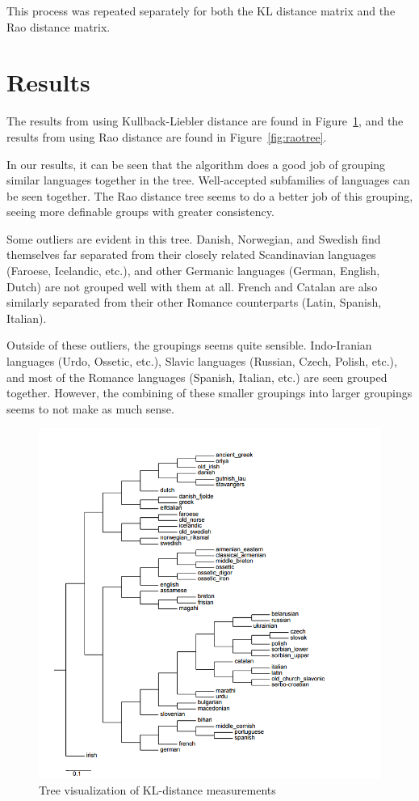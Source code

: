 \documentclass[10pt,a4]{article}
\begin{document}
This process was repeated separately for both the KL distance matrix and the Rao distance matrix.

\section{Results}
	
The results from using Kullback-Liebler distance are found in Figure~\ref{fig:kltree}, and the results from using Rao distance are found in Figure~\ref{fig:raotree}.

In our results, it can be seen that the algorithm does a good job of grouping similar languages together in the tree.  Well-accepted subfamilies of languages can be seen together.  The Rao distance tree seems to do a better job of this grouping, seeing more definable groups with greater consistency.

Some outliers are evident in this tree.  Danish, Norwegian, and Swedish find themselves far separated from their closely related Scandinavian languages (Faroese, Icelandic, etc.), and other Germanic languages (German, English, Dutch) are not grouped well with them at all.  French and Catalan are also similarly separated from their other Romance counterparts (Latin, Spanish, Italian).

Outside of these outliers, the groupings seems quite sensible.  Indo-Iranian languages (Urdo, Ossetic, etc.), Slavic languages (Russian, Czech, Polish, etc.), and most of the Romance languages (Spanish, Italian, etc.) are seen grouped together.  However, the combining of these smaller groupings into larger groupings seems to not make as much sense.

	
\begin{figure}[ht] 
	\centering 
	\includegraphics[width=\linewidth]{tree1(3)}
	\caption{Tree visualization of KL-distance measurements}
	\label{fig:kltree}
\end{figure}
\end{document}
